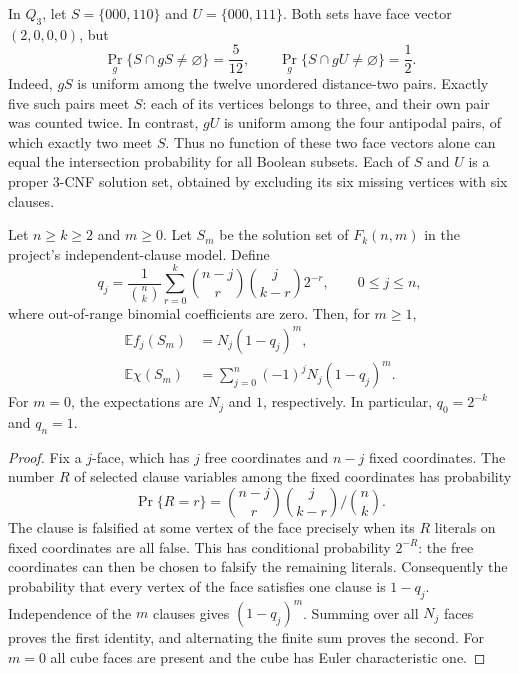 \begin{example}
\label{ex:face-profile-insufficient}
In $Q_3$, let $S=\{000,110\}$ and $U=\{000,111\}$.
Both sets have face vector $(2,0,0,0)$, but
\[
 \Pr_g\{S\cap gS\ne\varnothing\}=\frac5{12},
 \qquad
 \Pr_g\{S\cap gU\ne\varnothing\}=\frac12.
\]
Indeed, $gS$ is uniform among the twelve unordered distance-two pairs.
Exactly five such pairs meet $S$: each of its vertices belongs to three,
and their own pair was counted twice. In contrast, $gU$ is uniform among
the four antipodal pairs, of which exactly two meet $S$. Thus no function
of these two face vectors alone can equal the intersection probability
for all Boolean subsets. Each of $S$ and $U$ is a proper $3$-CNF solution
set, obtained by excluding its six missing vertices with six clauses.
\end{example}

\begin{proposition}
\label{prop:expected-cubical-faces}
Let $n\ge k\ge2$ and $m\ge0$. Let $S_m$ be the solution set of
$F_k(n,m)$ in the project's independent-clause model. Define
\[
 q_j=\frac{1}{\binom nk}
       \sum_{r=0}^{k}\binom{n-j}{r}\binom{j}{k-r}2^{-r},
       \qquad 0\le j\le n,
\]
where out-of-range binomial coefficients are zero. Then, for $m\ge1$,
\begin{align}
 \mathbb E f_j(S_m)&=N_j(1-q_j)^m, \label{eq:random-cubical-faces}\\
 \mathbb E\chi(S_m)&=\sum_{j=0}^n(-1)^jN_j(1-q_j)^m.
\end{align}
For $m=0$, the expectations are $N_j$ and $1$, respectively.
In particular, $q_0=2^{-k}$ and $q_n=1$.
\end{proposition}
\begin{proof}
Fix a $j$-face, which has $j$ free coordinates and $n-j$ fixed coordinates.
The number $R$ of selected clause variables among the fixed coordinates
has probability
\[
 \Pr\{R=r\}=\binom{n-j}{r}\binom{j}{k-r}/\binom nk.
\]
The clause is falsified at some vertex of the face precisely when its
$R$ literals on fixed coordinates are all false. This has conditional
probability $2^{-R}$: the free coordinates can then be chosen to falsify
the remaining literals. Consequently the probability that every vertex
of the face satisfies one clause is $1-q_j$. Independence of the $m$
clauses gives $(1-q_j)^m$. Summing over all $N_j$ faces proves the first
identity, and alternating the finite sum proves the second. For $m=0$
all cube faces are present and the cube has Euler characteristic one.
\end{proof}

